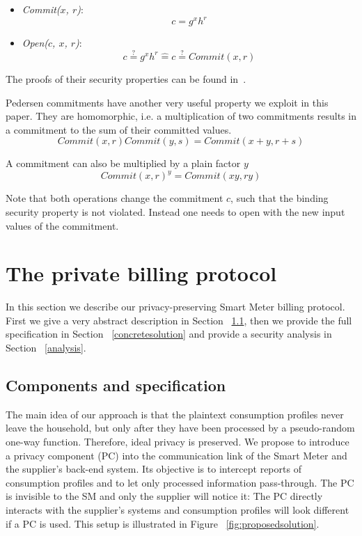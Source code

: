 \documentclass[english]{llncs}
\begin{document}
\newcommand{\entspricht}{\mathrel{\widehat{=}}}
\newcommand{\isequal}{\stackrel{?}{=}}


\begin{itemize}

\item {\em Commit($x$, $r$)}:
\[
c = g^x h^r
\]

\item {\em Open($c$, $x$, $r$)}:
\[
c \stackrel{?}{=} g^x h^r 
\entspricht c \isequal Commit(x,r)
\]

\end{itemize}

The proofs of their security properties can be found in~\cite{Ped}.

Pedersen commitments have another very useful property we exploit in this paper.
They are homomorphic, i.e. a multiplication of two commitments results in a commitment to the sum of their committed values.
\[
Commit(x, r) Commit(y, s) = Commit(x + y, r + s)
\]

A commitment can also be multiplied by a plain factor $y$
\[
Commit(x, r)^y = Commit(x y, r y)
\]

Note that both operations change the commitment $c$, such that the binding security property is not violated.
Instead one needs to open with the new input values of the commitment.


\section{The private billing protocol}
\label{sec:private_billing_protocol}
In this section we describe our privacy-preserving Smart Meter billing protocol.
First we give a very abstract description in Section ~\ref{abstractsolution}, then we provide the full specification in Section ~\ref{concretesolution} and provide a security analysis in Section ~\ref{analysis}.


\subsection{Components and specification}
\label{abstractsolution}
The main idea of our approach is that the plaintext consumption profiles never leave the household, but only after they have been processed by a pseudo-random one-way function.
Therefore, ideal privacy is preserved.
We propose to introduce a privacy component (PC) into the communication link of the Smart Meter and the supplier's back-end system.
Its objective is to intercept reports of consumption profiles and to let only processed information pass-through.
The PC is invisible to the SM and only the supplier will notice it: The PC directly interacts with the supplier's systems and consumption profiles will look different if a PC is used.
This setup is illustrated in Figure ~\ref{fig:proposedsolution}. 
\end{document}
